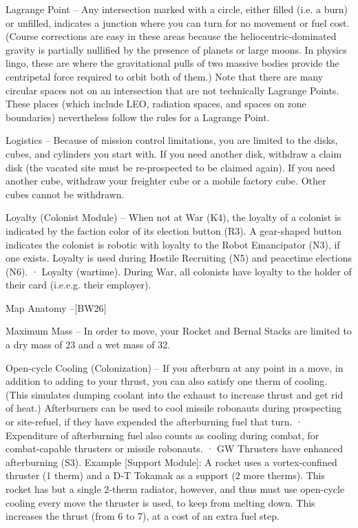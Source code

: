 \documentclass[a4paper]{book}
\begin{document}
Lagrange Point – Any intersection marked with a circle, either filled (i.e. a burn) or unfilled, indicates a junction where you can turn for no movement or fuel cost. (Course corrections are easy in these areas because the heliocentric-dominated gravity is partially nullified by the presence of planets or large moons. In physics lingo, these are where the gravitational pulls of two massive bodies provide the centripetal force required to orbit both of them.) Note that there are many circular spaces not on an intersection that are not technically Lagrange Points. These places (which include LEO, radiation spaces, and spaces on zone boundaries) nevertheless follow the rules for a Lagrange Point.

Logistics – Because of mission control limitations, you are limited to the disks, cubes, and cylinders you start with. If you need another disk, withdraw a claim disk (the vacated site must be re-prospected to be claimed again). If you need another cube, withdraw your freighter cube or a mobile factory cube. Other cubes cannot be withdrawn.

Loyalty (Colonist Module) – When not at War (K4), the loyalty of a colonist is indicated by the faction color of its election button (R3). A gear-shaped button indicates the colonist is robotic with loyalty to the Robot Emancipator (N3), if one exists. Loyalty is used during Hostile Recruiting (N5) and peacetime elections (N6).
·       Loyalty (wartime). During War, all colonists have loyalty to the holder of their card (i.e.e.g. their employer).

Map Anatomy –[BW26] 


Maximum Mass – In order to move, your Rocket and Bernal Stacks are limited to a dry mass of 23 and a wet mass of 32.

Open-cycle Cooling (Colonization) – If you afterburn at any point in a move, in addition to adding to your thrust, you can also satisfy one therm of cooling. (This simulates dumping coolant into the exhaust to increase thrust and get rid of heat.) Afterburners can be used to cool missile robonauts during prospecting or site-refuel, if they have expended the afterburning fuel that turn.
·   	Expenditure of afterburning fuel also counts as cooling during combat, for combat-capable thrusters or missile robonauts.
·       GW Thrusters have enhanced afterburning (S3).
Example [Support Module]: A rocket uses a vortex-confined thruster (1 therm) and a D-T Tokamak as a support (2 more therms). This rocket has but a single 2-therm radiator, however, and thus must use open-cycle cooling every move the thruster is used, to keep from melting down. This increases the thrust (from 6 to 7), at a cost of an extra fuel step.
\end{document}
